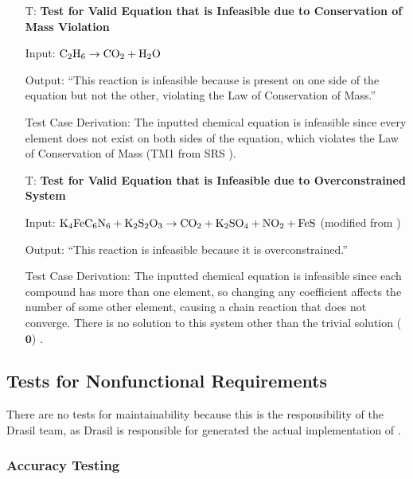 \documentclass[12pt, titlepage]{article}
\newcounter{testnum} %
\begin{document}
\begin{enumerate}

  \item[T\refstepcounter{testnum}\thetestnum \label{test_inf_cons_mass_valid_eqn}:]
    \textbf{Test for Valid Equation that is Infeasible due to Conservation of Mass
      Violation}

    Input: $\ce{C2H6} \rightarrow \ce{CO2} + \ce{H2O}$

    Output: ``This reaction is infeasible because  is present on one side
    of the equation but not the other, violating the Law of Conservation of
    Mass.''

    Test Case Derivation: The inputted chemical equation is infeasible since
    every element does not exist on both sides of the equation, which violates
    the Law of Conservation of Mass (TM1 from SRS ).

  \item[T\refstepcounter{testnum}\thetestnum \label{test_inf_over_valid_eqn}:]
    \textbf{Test for Valid Equation that is Infeasible due to Overconstrained
      System}

    Input: $\ce{K4FeC6N6} + \ce{K2S2O3} \rightarrow \ce{CO2} + \ce{K2SO4} +
      \ce{NO2} + \ce{FeS}$ (modified from \cite{hamid_balancing_2019})

    Output: ``This reaction is infeasible because it is overconstrained.''

    Test Case Derivation: The inputted chemical equation is infeasible since
    each compound has more than one element, so changing any coefficient
    affects the number of some other element, causing a chain reaction that
    does not converge. There is no solution to this system other than the
    trivial solution ($\mathbf{0}$) \cite{hamid_balancing_2019}.

\end{enumerate}

\subsection{Tests for Nonfunctional Requirements}

There are no tests for maintainability because this is the responsibility of
the Drasil team, as Drasil is responsible for generated the actual
implementation of \progname{}.

\subsubsection{Accuracy Testing}
\end{document}
